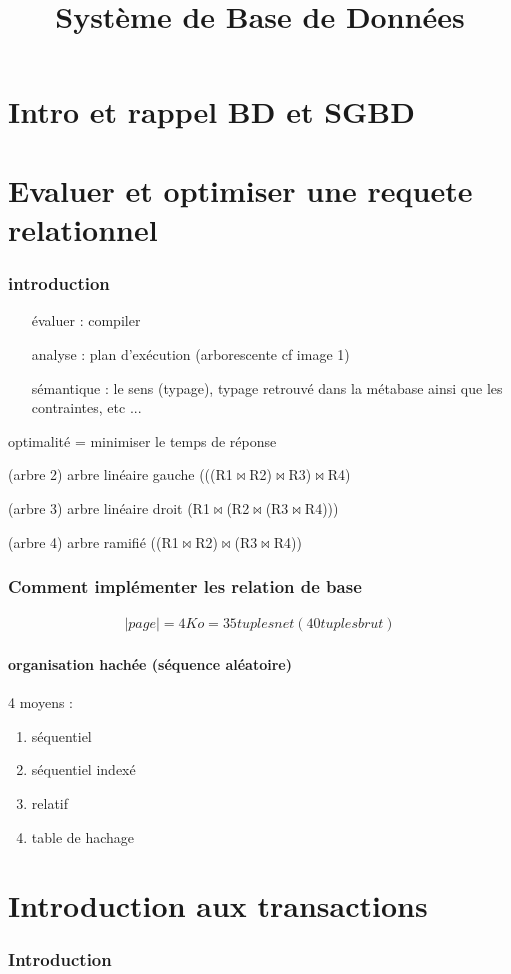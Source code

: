 \documentclass[10pt,a4paper]{article}
\title{Système de Base de Données}
\date{}
\begin{document}
\maketitle

\part{Intro et rappel BD et SGBD}
\part{Evaluer et optimiser une requete relationnel}
\section{introduction}
\begin{enumerate}
\item[évaluer :] compiler
\item[analyse :] plan d'exécution (arborescente cf image 1)
\item[sémantique :] le sens (typage), typage retrouvé dans la métabase ainsi que les contraintes, etc ...
\end{enumerate}

optimalité = minimiser le temps de réponse

(arbre 2)
arbre linéaire gauche (((R1$\Join$R2)$\Join$R3)$\Join$R4)

(arbre 3)
arbre linéaire droit (R1$\Join$(R2$\Join$(R3$\Join$R4)))

(arbre 4)
arbre ramifié ((R1$\Join$R2)$\Join$(R3$\Join$R4))
\section{Comment implémenter les relation de base}

\begin{eqnarray*}
	\mid page \mid = 4Ko = 35 tuples net (40 tuples brut)
\end{eqnarray*}

\subsection{organisation hachée (séquence aléatoire)}
4 moyens :
\begin{enumerate}
\item séquentiel
\item séquentiel indexé
\item relatif
\item table de hachage
\end{enumerate}
\part{Introduction aux transactions}
\section{Introduction}
\end{document}
